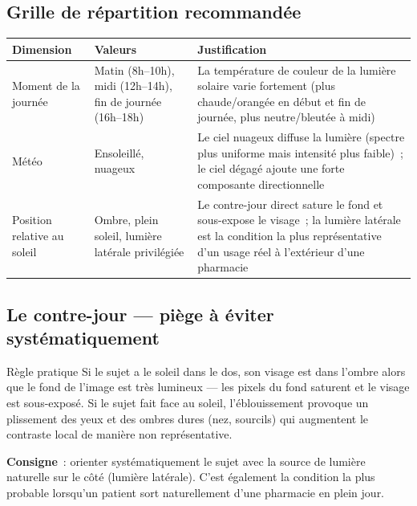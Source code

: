 \documentclass[11pt,a4paper]{article}
\begin{document}
\subsection{Grille de r\'epartition recommand\'ee}

\begin{center}
\begin{tabularx}{\textwidth}{P{3.5cm} P{3cm} X}
\toprule
\textbf{Dimension} & \textbf{Valeurs} & \textbf{Justification} \\
\midrule
Moment de la journ\'ee & Matin (8h--10h), midi (12h--14h), fin de journ\'ee
(16h--18h) & La temp\'erature de couleur de la lumi\`ere solaire varie
fortement (plus chaude/orang\'ee en d\'ebut et fin de journ\'ee, plus
neutre/bleut\'ee \`a midi) \\
M\'et\'eo & Ensoleill\'e, nuageux & Le ciel nuageux diffuse la lumi\`ere
(spectre plus uniforme mais intensit\'e plus faible)~; le ciel d\'egag\'e
ajoute une forte composante directionnelle \\
Position relative au soleil & Ombre, plein soleil, lumi\`ere lat\'erale
privil\'egi\'ee & Le contre-jour direct sature le fond et sous-expose le
visage~; la lumi\`ere lat\'erale est la condition la plus repr\'esentative
d'un usage r\'eel \`a l'ext\'erieur d'une pharmacie \\
\bottomrule
\end{tabularx}
\end{center}

\subsection{Le contre-jour --- pi\`ege \`a \'eviter syst\'ematiquement}

\begin{warnbox}{R\`egle pratique}
Si le sujet a le soleil dans le dos, son visage est dans l'ombre alors que
le fond de l'image est tr\`es lumineux --- les pixels du fond saturent et le
visage est sous-expos\'e. Si le sujet fait face au soleil, l'\'eblouissement
provoque un plissement des yeux et des ombres dures (nez, sourcils) qui
augmentent le contraste local de mani\`ere non repr\'esentative.

\textbf{Consigne}~: orienter syst\'ematiquement le sujet avec la source de
lumi\`ere naturelle sur le c\^ot\'e (lumi\`ere lat\'erale). C'est \'egalement
la condition la plus probable lorsqu'un patient sort naturellement d'une
pharmacie en plein jour.
\end{warnbox}
\end{document}
